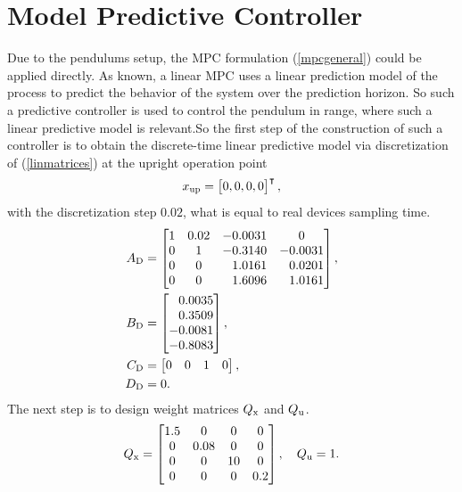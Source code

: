 \section{Model Predictive Controller}
Due to the pendulums setup, the MPC formulation (\ref{mpcgeneral}) could be applied directly. As known, a linear MPC uses a linear prediction model of the process to predict the behavior of the system over the prediction horizon. So such a predictive controller is used to control the pendulum in range, where such a linear predictive model is relevant.So the first step of the construction of such a controller is to obtain the discrete-time linear predictive model via discretization of (\ref{linmatrices}) at the upright operation point 
\begin{equation}
	x _{\text{up}} = \begin{bmatrix}0,0,0,0\end{bmatrix}^\intercal, 
\end{equation}
with the discretization step $0.02$, what is equal to real devices sampling time. 
\begin{subequations}\label{dismatrices}
	\begin{align}
	A _{\text{D}} &=\begin{bmatrix}
	1&0.02&-0.0031& 0\\
	0&1&-0.3140&-0.0031\\
	0&0&\ \; \,1.0161&\ \; \,0.0201\\
	0&0&\ \; \,1.6096&\ \; \,1.0161
	\end{bmatrix},\\
	B _{\text{D}} &=\begin{bmatrix}
	\ \; \,0.0035\\
	\ \; \,0.3509\\
	-0.0081\\
	-0.8083
	\end{bmatrix},\\
	C _{\text{D}} &= \begin{bmatrix}0&0&1&0\end{bmatrix},\\
	D _{\text{D}} &= 0.
	\end{align}
\end{subequations}
The next step is to design weight matrices $Q _{\text{x}}$ and $Q _{\text{u}}$.
\begin{equation}
Q _{\text{x}} = \begin{bmatrix}
1.5&0&0&0\\
0&0.08&0&0\\
0&0&10&0\\
0&0&0&0.2
\end{bmatrix}, \quad Q _{\text{u}} = 1.
\end{equation}
